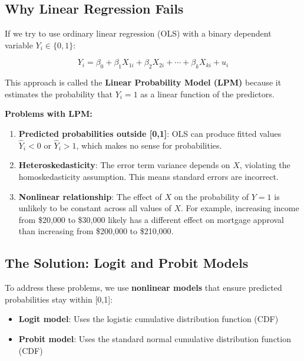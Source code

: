 \documentclass[
  12pt,
  letterpaper,
]{scrbook}
\providecommand{\tightlist}{%
  \setlength{\itemsep}{0pt}\setlength{\parskip}{0pt}}
\renewcommand{\tightlist}{\setlength{\itemsep}{0.5\baselineskip}\setlength{\parskip}{0.2\baselineskip}}
\theoremstyle{plain}
\theoremstyle{definition}
\theoremstyle{remark}
\begin{document}
\subsection{Why Linear Regression
Fails}\label{why-linear-regression-fails}

If we try to use ordinary linear regression (OLS) with a binary
dependent variable \(Y_i \in \{0,1\}\):

\[
Y_i = \beta_0 + \beta_1 X_{1i} + \beta_2 X_{2i} + \cdots + \beta_k X_{ki} + u_i
\]

This approach is called the \textbf{Linear Probability Model (LPM)}
because it estimates the probability that \(Y_i = 1\) as a linear
function of the predictors.

\textbf{Problems with LPM:}

\begin{enumerate}
\def\labelenumi{\arabic{enumi}.}
\item
  \textbf{Predicted probabilities outside {[}0,1{]}}: OLS can produce
  fitted values \(\hat{Y}_i < 0\) or \(\hat{Y}_i > 1\), which makes no
  sense for probabilities.
\item
  \textbf{Heteroskedasticity}: The error term variance depends on \(X\),
  violating the homoskedasticity assumption. This means standard errors
  are incorrect.
\item
  \textbf{Nonlinear relationship}: The effect of \(X\) on the
  probability of \(Y=1\) is unlikely to be constant across all values of
  \(X\). For example, increasing income from {\$20,000} to {\$30,000}
  likely has a different effect on mortgage approval than increasing
  from {\$200,000} to {\$210,000}.
\end{enumerate}

\subsection{The Solution: Logit and Probit
Models}\label{the-solution-logit-and-probit-models}

To address these problems, we use \textbf{nonlinear models} that ensure
predicted probabilities stay within {[}0,1{]}:

\begin{itemize}
\tightlist
\item
  \textbf{Logit model}: Uses the logistic cumulative distribution
  function (CDF)
\item
  \textbf{Probit model}: Uses the standard normal cumulative
  distribution function (CDF)
\end{itemize}
\end{document}
